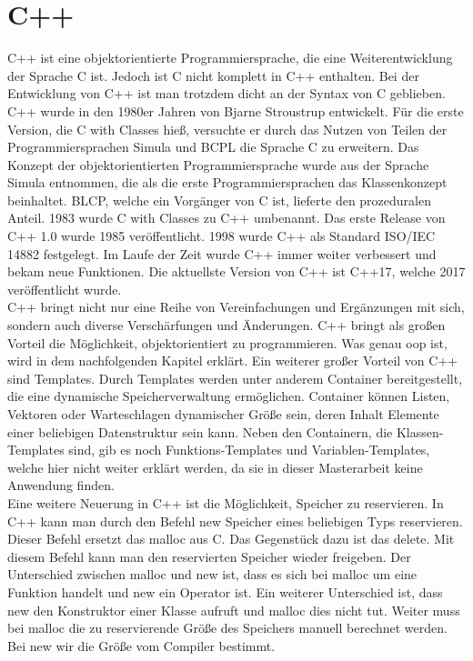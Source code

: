 \section{C++ }
C++ ist eine objektorientierte Programmiersprache, die eine Weiterentwicklung der Sprache C ist. Jedoch ist C nicht komplett in C++ enthalten. Bei der Entwicklung von C++ ist man trotzdem dicht an der Syntax von C geblieben. C++ wurde in den 1980er Jahren von Bjarne Stroustrup entwickelt. Für die erste Version, die \glqq C with Classes\grqq{} hieß, versuchte er durch das Nutzen von Teilen der Programmiersprachen Simula und BCPL die Sprache C zu erweitern. Das Konzept der objektorientierten Programmiersprache  wurde aus der Sprache Simula entnommen, die als die erste Programmiersprachen das Klassenkonzept beinhaltet.  BLCP, welche ein Vorgänger von C ist, lieferte den  prozeduralen Anteil.   1983 wurde \glqq C with Classes\grqq{} zu C++ umbenannt. Das erste Release von C++ 1.0 wurde 1985 veröffentlicht. 1998 wurde C++ als Standard \glqq ISO/IEC 14882\grqq{} festgelegt. Im Laufe der Zeit wurde C++ immer weiter verbessert und bekam neue Funktionen. Die aktuellste Version von C++ ist C++17, welche 2017 veröffentlicht wurde.\\
C++ bringt nicht nur eine Reihe von Vereinfachungen und Ergänzungen mit sich, sondern auch diverse Verschärfungen und Änderungen. 
C++ bringt als großen Vorteil die Möglichkeit, objektorientiert zu programmieren. Was genau  \acl{oop} ist, wird in dem nachfolgenden Kapitel erklärt. Ein weiterer großer Vorteil von C++ sind Templates. Durch Templates werden unter anderem Container bereitgestellt, die eine dynamische Speicherverwaltung ermöglichen. Container können Listen, Vektoren oder Warteschlagen dynamischer Größe sein, deren Inhalt Elemente einer beliebigen Datenstruktur sein kann. Neben den Containern, die Klassen-Templates  sind,  gib es noch Funktions-Templates und Variablen-Templates, welche hier nicht weiter erklärt werden, da sie in dieser Masterarbeit keine Anwendung finden. \\
Eine weitere Neuerung in C++ ist die Möglichkeit, Speicher zu reservieren. In C++ kann man durch den Befehl \glqq new\grqq{} Speicher eines beliebigen Typs reservieren. Dieser Befehl ersetzt das \glqq malloc\grqq{} aus C.  Das Gegenstück dazu ist das  \glqq delete\grqq{}. Mit diesem Befehl kann man den reservierten Speicher wieder freigeben. Der Unterschied zwischen  \glqq malloc\grqq{} und \glqq new\grqq{} ist, dass es sich bei \glqq malloc\grqq{} um eine Funktion handelt  und \glqq new\grqq{} ein Operator ist.  Ein weiterer Unterschied  ist, dass \glqq new\grqq{} den Konstruktor einer Klasse aufruft und \glqq malloc\grqq{} dies nicht tut. Weiter muss bei \glqq malloc\grqq{} die zu reservierende Größe des Speichers manuell berechnet werden. Bei  \glqq new\grqq{} wir die Größe vom Compiler bestimmt. \\
